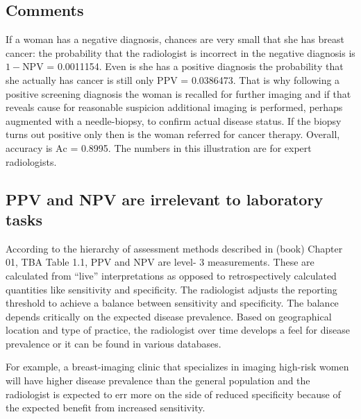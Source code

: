 \documentclass[
]{book}
\begin{document}
\hypertarget{binary-task-npv-ppv-comments}{%
\subsection{Comments}\label{binary-task-npv-ppv-comments}}

If a woman has a negative diagnosis, chances are very small that she has breast cancer: the probability that the radiologist is incorrect in the negative diagnosis is \(1 - \text{NPV}\) = 0.0011154. Even is she has a positive diagnosis the probability that she actually has cancer is still only \(\text{PPV}\) = 0.0386473. That is why following a positive screening diagnosis the woman is recalled for further imaging and if that reveals cause for reasonable suspicion additional imaging is performed, perhaps augmented with a needle-biopsy, to confirm actual disease status. If the biopsy turns out positive only then is the woman referred for cancer therapy. Overall, accuracy is \(\text{Ac}\) = 0.8995. The numbers in this illustration are for expert radiologists.

\hypertarget{binary-task-npv-ppv-irrel-lab}{%
\subsection{PPV and NPV are irrelevant to laboratory tasks}\label{binary-task-npv-ppv-irrel-lab}}

According to the hierarchy of assessment methods described in (book) Chapter 01, TBA Table 1.1, \(\text{PPV}\) and \(\text{NPV}\) are level- 3 measurements. These are calculated from ``live'' interpretations as opposed to retrospectively calculated quantities like sensitivity and specificity. The radiologist adjusts the reporting threshold to achieve a balance between sensitivity and specificity. The balance depends critically on the expected disease prevalence. Based on geographical location and type of practice, the radiologist over time develops a feel for disease prevalence or it can be found in various databases.

For example, a breast-imaging clinic that specializes in imaging high-risk women will have higher disease prevalence than the general population and the radiologist is expected to err more on the side of reduced specificity because of the expected benefit from increased sensitivity.
\end{document}
